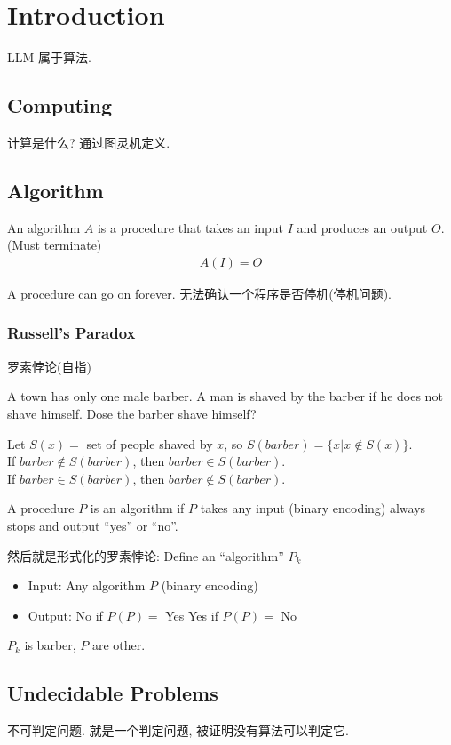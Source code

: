 \newpage
\section{Introduction}
LLM 属于算法.

\subsection{Computing}
计算是什么? 通过图灵机定义. 

\subsection{Algorithm}
\begin{definition}
    An algorithm $A$ is a procedure that takes an input $I$ and produces an output $O$. (Must terminate)
    \begin{align*}
        A(I)=O
    \end{align*}
\end{definition}
A procedure can go on forever. 无法确认一个程序是否停机(停机问题).

\subsubsection{Russell's Paradox}
罗素悖论(自指)

A town has only one male barber. A man is shaved by the barber if he does not shave himself. Dose the barber shave himself?

Let $S(x)=$ set of people shaved by $x$, so $S(barber)=\{ x|x\notin S(x) \}$.\\
If $barber \notin S(barber)$, then $barber \in S(barber)$. \\
If $barber \in S(barber)$, then $barber \notin S(barber)$. 

\begin{definition}
    A procedure $P$ is an algorithm if $P$ takes any input (binary encoding) always stops and output ``yes'' or ``no''.
\end{definition}
然后就是形式化的罗素悖论: Define an ``algorithm'' $P_k$
\begin{itemize}
    \item Input: Any algorithm $P$ (binary encoding)
    \item Output: 
    \subitem No if $P(P)=$ Yes
    \subitem Yes if $P(P)=$ No
\end{itemize}
$P_k$ is barber, $P$ are other.

\subsection{Undecidable Problems}
不可判定问题. 就是一个判定问题, 被证明没有算法可以判定它. 

